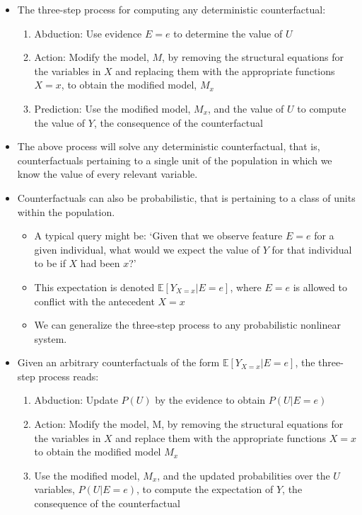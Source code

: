 \documentclass[]{article}
\providecommand{\tightlist}{%
  \setlength{\itemsep}{0pt}\setlength{\parskip}{0pt}}
\begin{document}
\begin{itemize}
\item
  The three-step process for computing any deterministic counterfactual:

  \begin{enumerate}
  \def\labelenumi{\arabic{enumi}.}
  \tightlist
  \item
    Abduction: Use evidence \(E = e\) to determine the value of \(U\)
  \item
    Action: Modify the model, \(M\), by removing the structural
    equations for the variables in \(X\) and replacing them with the
    appropriate functions \(X = x\), to obtain the modified model,
    \(M_x\)
  \item
    Prediction: Use the modified model, \(M_x\), and the value of \(U\)
    to compute the value of \(Y\), the consequence of the counterfactual
  \end{enumerate}
\item
  The above process will solve any deterministic counterfactual, that
  is, counterfactuals pertaining to a single unit of the population in
  which we know the value of every relevant variable.
\item
  Counterfactuals can also be probabilistic, that is pertaining to a
  class of units within the population.

  \begin{itemize}
  \tightlist
  \item
    A typical query might be: `Given that we observe feature \(E = e\)
    for a given individual, what would we expect the value of \(Y\) for
    that individual to be if \(X\) had been \(x\)?'
  \item
    This expectation is denoted \(\mathbb{E}[Y_{X = x}|E = e]\), where
    \(E = e\) is allowed to conflict with the antecedent \(X = x\)
  \item
    We can generalize the three-step process to any probabilistic
    nonlinear system.
  \end{itemize}
\item
  Given an arbitrary counterfactuals of the form
  \(\mathbb{E}[Y_{X = x} | E = e]\), the three-step process reads:

  \begin{enumerate}
  \def\labelenumi{\arabic{enumi}.}
  \tightlist
  \item
    Abduction: Update \(P(U)\) by the evidence to obtain \(P(U|E = e)\)
  \item
    Action: Modify the model, M, by removing the structural equations
    for the variables in \(X\) and replace them with the appropriate
    functions \(X = x\) to obtain the modified model \(M_x\)
  \item
    Use the modified model, \(M_x\), and the updated probabilities over
    the \(U\) variables, \(P(U|E = e)\), to compute the expectation of
    \(Y\), the consequence of the counterfactual
  \end{enumerate}
\end{itemize}
\end{document}
